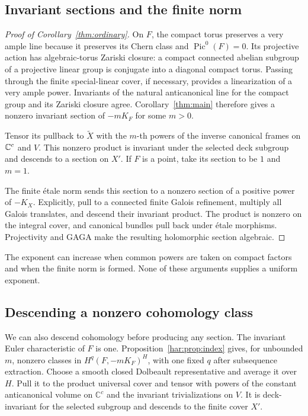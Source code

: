 \subsection{Invariant sections and the finite norm}\label{har:subsec:sectiondescent}
\begin{proof}[Proof of Corollary~\ref{thm:ordinary}]
On $F$, the compact torus preserves a very ample line because it preserves its Chern class and $\operatorname{Pic}^0(F)=0$. Its projective action has algebraic-torus Zariski closure: a compact connected abelian subgroup of a projective linear group is conjugate into a diagonal compact torus. Passing through the finite special-linear cover, if necessary, provides a linearization of a very ample power. Invariants of the natural anticanonical line for the compact group and its Zariski closure agree. Corollary~\ref{thm:main} therefore gives a nonzero invariant section of $-mK_F$ for some $m>0$.

Tensor its pullback to $\widetilde X$ with the $m$-th powers of the inverse canonical frames on $\mathbb C^c$ and $V$. This nonzero product is invariant under the selected deck subgroup and descends to a section on $X'$. If $F$ is a point, take its section to be $1$ and $m=1$.

The finite \'etale norm \cite[Lemma \textnormal{(Finite \'etale norm)}]{CompanionH} sends this section to a nonzero section of a positive power of $-K_X$. Explicitly, pull to a connected finite Galois refinement, multiply all Galois translates, and descend their invariant product. The product is nonzero on the integral cover, and canonical bundles pull back under \'etale morphisms. Projectivity and GAGA make the resulting holomorphic section algebraic.
\end{proof}

The exponent can increase when common powers are taken on compact factors and when the finite norm is formed. None of these arguments supplies a uniform exponent.

\subsection{Descending a nonzero cohomology class}\label{har:subsec:cohomdescent}

We can also descend cohomology before producing any section.
The invariant Euler characteristic of $F$ is one. Proposition~\ref{har:prop:index} gives, for unbounded \(m\),
nonzero classes in \(H^q(F,-mK_F)^H\), with one fixed \(q\) after
subsequence extraction. Choose a smooth closed Dolbeault representative
and average it over \(H\). Pull it to the product universal cover and
tensor with powers of the constant anticanonical volume on
\(\mathbb C^c\) and the invariant trivializations on \(V\). It is
deck-invariant for the selected subgroup and descends to the finite
cover \(X'\).

